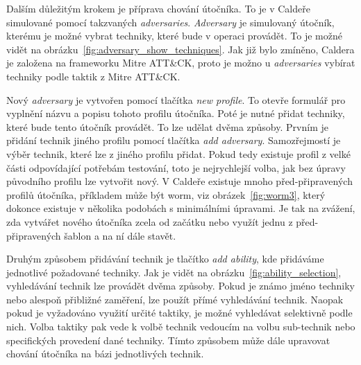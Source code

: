 
Dalším důležitým krokem je příprava chování útočníka.
To je v Caldeře simulované pomocí takzvaných \textit{adversaries}.
\textit{Adversary} je simulovaný útočník, kterému je možné vybrat techniky, které bude v operaci provádět.
To je možné vidět na obrázku~\ref{fig:adversary_show_techniques}.
Jak již bylo zmíněno, Caldera je založena na frameworku Mitre ATT\&CK, proto je možno u \textit{adversaries} vybírat techniky podle taktik z Mitre ATT\&CK\@.



Nový \textit{adversary} je vytvořen pomocí tlačítka \textit{new profile}.
To otevře formulář pro vyplnění názvu a popisu tohoto profilu útočníka.
Poté je nutné přidat techniky, které bude tento útočník provádět.
To lze udělat dvěma způsoby.
Prvním je přidání technik jiného profilu pomocí tlačítka \textit{add adversary}.
Samozřejmostí je výběr technik, které lze z jiného profilu přidat.
Pokud tedy existuje profil z velké části odpovídající potřebám testování, toto je nejrychlejší volba, jak bez úpravy původního profilu lze vytvořit nový.
V Caldeře existuje mnoho před-připravených profilů útočníka, příkladem může být worm, viz obrázek~\ref{fig:worm3}, který dokonce existuje v několika podobách s minimálními úpravami.
Je tak na zvážení, zda vytvářet nového útočníka zcela od začátku nebo využít jednu z před-připravených šablon a na ní dále stavět.


Druhým způsobem přidávání technik je tlačítko \textit{add ability}, kde přidáváme jednotlivé požadované techniky.
Jak je vidět na obrázku~\ref{fig:ability_selection}, vyhledávání technik lze provádět dvěma způsoby.
Pokud je známo jméno techniky nebo alespoň přibližné zaměření, lze použít přímé vyhledávání technik.
Naopak pokud je vyžadováno využití určité taktiky, je možné vyhledávat selektivně podle nich.
Volba taktiky pak vede k volbě technik vedoucím na volbu sub-technik nebo specifických provedení dané techniky.
Tímto způsobem může dále upravovat chování útočníka na bázi jednotlivých technik.


